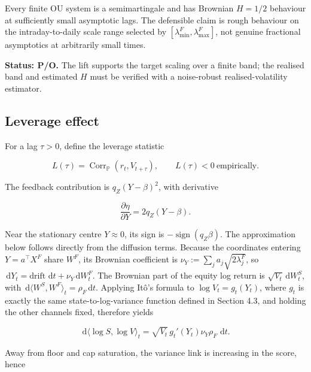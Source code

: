 \documentclass[11pt,a4paper]{article}
\newcommand{\Pp}{\mathbb{P}}
\newcommand{\dd}{\,\mathrm{d}}
\newcommand{\Corr}{\operatorname{Corr}}
\begin{document}
\begin{warningbox}
Every finite OU system is a semimartingale and has Brownian \(H=1/2\) behaviour at sufficiently
small asymptotic lags. The defensible claim is rough behaviour on the intraday-to-daily scale
range selected by \([\lambda_{\min}^F,\lambda_{\max}^F]\), not genuine fractional asymptotics
at arbitrarily small times.
\end{warningbox}

\textbf{Status: P/O.} The lift supports the target scaling over a finite band; the realised
band and estimated \(H\) must be verified with a noise-robust realised-volatility estimator.

\subsection{Leverage effect}

For a lag \(\tau>0\), define the leverage statistic

\begin{equation}
L(\tau)=\Corr_{\Pp}\!\left(r_t,V_{t+\tau}\right),
\qquad L(\tau)<0\ \text{empirically}.
\end{equation}

The feedback contribution is \(q_Z(Y-\beta)^2\), with derivative

\begin{equation}
\frac{\partial\eta}{\partial Y}=2q_Z(Y-\beta).
\end{equation}

Near the stationary centre \(Y\approx0\), its sign is \(-\operatorname{sign}(q_Z\beta)\).
The approximation below follows directly from the diffusion terms.  Because the coordinates
entering \(Y=a^\top X^F\) share \(W^F\), its Brownian coefficient is
\(\nu_Y:=\sum_j a_j\sqrt{2\lambda_j^F}\), so
\(\dd Y_t=\text{drift}\,\dd t+\nu_Y\dd W_t^F\).  The Brownian part of the equity log return is
\(\sqrt{V_t}\dd W_t^S\), with \(\dd\langle W^S,W^F\rangle_t=\rho_F\dd t\).
Applying It\^o's formula to \(\log V_t=g_t(Y_t)\), where \(g_t\) is exactly the same
state-to-log-variance function defined in Section 4.3, and holding the other channels fixed,
therefore yields

\begin{equation*}
\dd\langle\log S,\log V\rangle_t
=\sqrt{V_t}\,g_t'(Y_t)\nu_Y\rho_F\,\dd t.
\end{equation*}

Away from floor and cap saturation, the variance link is increasing in the score, hence
\end{document}

